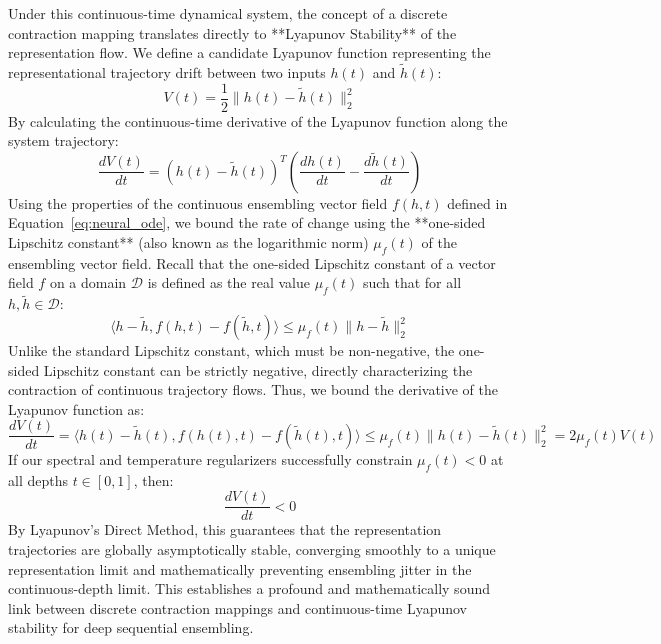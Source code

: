 \documentclass{article}
\theoremstyle{plain}
\theoremstyle{definition}
\theoremstyle{remark}
\begin{document}
Under this continuous-time dynamical system, the concept of a discrete contraction mapping translates directly to **Lyapunov Stability** of the representation flow. We define a candidate Lyapunov function representing the representational trajectory drift between two inputs $h(t)$ and $\tilde{h}(t)$:
\begin{equation}
V(t) = \frac{1}{2} \|h(t) - \tilde{h}(t)\|_2^2
\end{equation}
By calculating the continuous-time derivative of the Lyapunov function along the system trajectory:
\begin{equation}
\frac{dV(t)}{dt} = \left( h(t) - \tilde{h}(t) \right)^T \left( \frac{dh(t)}{dt} - \frac{d\tilde{h}(t)}{dt} \right)
\end{equation}
Using the properties of the continuous ensembling vector field $f(h, t)$ defined in Equation~\ref{eq:neural_ode}, we bound the rate of change using the **one-sided Lipschitz constant** (also known as the logarithmic norm) $\mu_f(t)$ of the ensembling vector field. Recall that the one-sided Lipschitz constant of a vector field $f$ on a domain $\mathcal{D}$ is defined as the real value $\mu_f(t)$ such that for all $h, \tilde{h} \in \mathcal{D}$:
\begin{equation}
\langle h - \tilde{h}, f(h, t) - f(\tilde{h}, t) \rangle \le \mu_f(t) \|h - \tilde{h}\|_2^2
\end{equation}
Unlike the standard Lipschitz constant, which must be non-negative, the one-sided Lipschitz constant can be strictly negative, directly characterizing the contraction of continuous trajectory flows. Thus, we bound the derivative of the Lyapunov function as:
\begin{equation}
\frac{dV(t)}{dt} = \langle h(t) - \tilde{h}(t), f(h(t), t) - f(\tilde{h}(t), t) \rangle \le \mu_f(t) \|h(t) - \tilde{h}(t)\|_2^2 = 2 \mu_f(t) V(t)
\end{equation}
If our spectral and temperature regularizers successfully constrain $\mu_f(t) < 0$ at all depths $t \in [0, 1]$, then:
\begin{equation}
\frac{dV(t)}{dt} < 0
\end{equation}
By Lyapunov's Direct Method, this guarantees that the representation trajectories are globally asymptotically stable, converging smoothly to a unique representation limit and mathematically preventing ensembling jitter in the continuous-depth limit. This establishes a profound and mathematically sound link between discrete contraction mappings and continuous-time Lyapunov stability for deep sequential ensembling.
\end{document}
